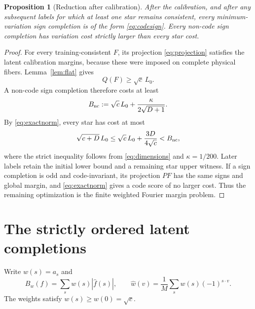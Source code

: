 \documentclass[11pt]{article}
\newtheorem{proposition}[theorem]{Proposition}
\begin{document}
\begin{proposition}[Reduction after calibration]\label{prop:codereduction}
After the calibration, and after any subsequent labels for which at
least one star remains consistent, every minimum-variation sign
completion is of the form \eqref{eq:codesign}. Every non-code sign
completion has variation cost strictly larger than every star cost.
\end{proposition}
\begin{proof}
For every training-consistent $F$, its projection \eqref{eq:projection}
satisfies the latent calibration margins, because these were imposed on
complete physical fibers. Lemma~\ref{lem:flat} gives
\[
 Q(F)\ge\sqrt c\,L_0.
\]
A non-code sign completion therefore costs at least
\begin{equation}\label{eq:noncodebarrier}
 B_{\rm nc}:=\sqrt c\,L_0+\frac{\kappa}{2\sqrt{D+1}}.
\end{equation}
By \eqref{eq:exactnorm}, every star has cost at most
\begin{equation}\label{eq:starupper}
 \sqrt{c+D}\,L_0
   \le\sqrt c\,L_0+\frac{3D}{4\sqrt c}
   <B_{\rm nc},
\end{equation}
where the strict inequality follows from \eqref{eq:dimensions} and
$\kappa=1/200$. Later labels retain the initial lower bound and a
remaining star upper witness. If a sign completion is odd and
code-invariant, its projection $PF$ has the same signs and global
margin, and \eqref{eq:exactnorm} gives a code score of no larger cost.
Thus the remaining optimization is the finite weighted Fourier margin
problem.
\end{proof}

\section{The strictly ordered latent completions}

Write $w(s)=a_s$ and
\[
 B_w(f)=\sum_s w(s)|\widehat f(s)|,
 \qquad
 \widehat w(v)=\frac1M\sum_s w(s)(-1)^{s\cdot v}.
\]
The weights satisfy $w(s)\ge w(0)=\sqrt c$.
\end{document}

